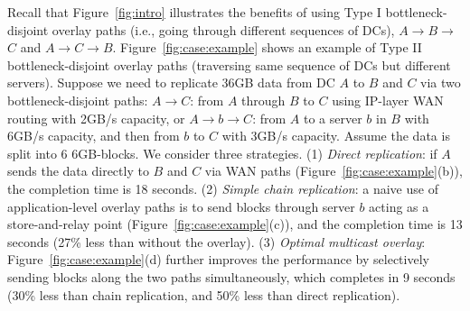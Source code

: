 Recall that Figure~\ref{fig:intro} illustrates the benefits of
using Type I bottleneck-disjoint overlay paths
(i.e., going through different sequences of DCs),
$A$$\rightarrow$$B$$\rightarrow$$C$ and
$A$$\rightarrow$$C$$\rightarrow$$B$.
Figure~\ref{fig:case:example} shows an example
of Type II bottleneck-disjoint overlay paths
(traversing same sequence of DCs but different servers).
Suppose we need to replicate 36GB data from DC $A$
to $B$ and $C$ via two bottleneck-disjoint paths:
$A$$\rightarrow$$C$:
from $A$ through $B$ to $C$ using IP-layer WAN routing with
2GB/s capacity, or
$A$$\rightarrow$$b$$\rightarrow$$C$: from $A$ to a server
$b$ in $B$ with
6GB/s capacity, and then from $b$ to $C$ with 3GB/s capacity.
Assume the data is split into 6 6GB-blocks.
We consider three strategies.
(1) {\em Direct replication}:
if $A$ sends the data directly to $B$ and $C$ via WAN paths
(Figure~\ref{fig:case:example}(b)),
the completion time is 18 seconds.
(2) {\em Simple chain replication}:
a naive use of application-level overlay paths
is to send blocks through server $b$ acting as a
store-and-relay point
(Figure~\ref{fig:case:example}(c)),
and the completion time is 13 seconds (27\% less than without
the overlay).
(3) {\em Optimal multicast overlay}:
Figure~\ref{fig:case:example}(d) further improves the performance by
selectively sending blocks along the two paths simultaneously,
which completes in 9 seconds (30\% less than chain replication,
and 50\% less than direct replication).



